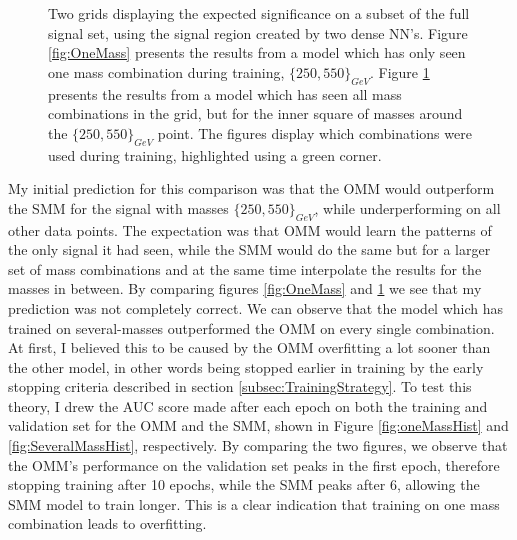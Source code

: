 \begin{figure}
{\begin{subfigure}{.6\textwidth}
        \vspace{-1.cm}
        \caption{}
        \label{fig:SeveralMass}
    \end{subfigure}
    }
    \caption[Two grids displaying the expected significance on a subset of the full signal set, using the signal region 
    created by two dense \acs{NN}'s, each training on different amounts of signal.]{Two grids displaying the expected significance 
    on a subset of the full signal set, using the signal region created by two dense \ac{NN}'s. Figure \ref{fig:OneMass} presents the results 
    from a model which has only seen one mass combination during training, $\{250,550\}_{GeV}$. Figure 
    \ref{fig:SeveralMass} presents the results from a model which has seen all mass combinations in the grid, but for the inner square of masses
    around the $\{250,550\}_{GeV}$ point. The figures display which combinations were used during training, highlighted using a green corner. 
    }
    \label{fig:Interpolation}
\end{figure}
My initial prediction for this comparison was that the \ac{OMM} would outperform the \ac{SMM} for the signal with masses
$\{250,550\}_{GeV}$, while underperforming on all other data points. The expectation was that \ac{OMM} 
would learn the patterns of the only signal it had seen, while the \ac{SMM} would do the same but for a larger set of mass combinations and 
at the same time interpolate the results for the masses in between. By comparing figures \ref{fig:OneMass} and \ref{fig:SeveralMass} we 
see that my prediction was not completely correct. We can observe that the model which has trained on several-masses outperformed the 
\ac{OMM} on every single combination. At first, I believed this to be caused by the \ac{OMM} overfitting a lot sooner than the other 
model, in other words being stopped earlier in training by the early stopping criteria described in section \ref{subsec:TrainingStrategy}. 
To test this theory, I drew the \ac{AUC} score made after each epoch on both the training and validation set for the \ac{OMM} and the 
\ac{SMM}, shown in Figure \ref{fig:oneMassHist} and \ref{fig:SeveralMassHist}, respectively. By comparing the two figures,
we observe that the \ac{OMM}'s performance on the validation set peaks in the first epoch, therefore stopping training after 
10 epochs, while the \ac{SMM} peaks after 6, allowing the \ac{SMM} model to train longer. This is a clear indication that training on 
one mass combination leads to overfitting. 

